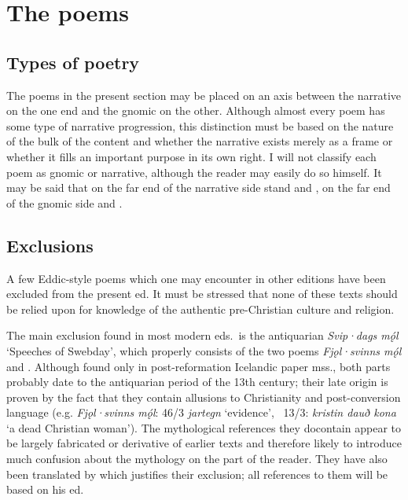 \section{The poems}

\subsection{Types of poetry}

The poems in the present section may be placed on an axis between the narrative on the one end and the gnomic on the other.  Although almost every poem has some type of narrative progression, this distinction must be based on the nature of the bulk of the content and whether the narrative exists merely as a frame or whether it fills an important purpose in its own right.  I will not classify each poem as gnomic or narrative, although the reader may easily do so himself.  It may be said that on the far end of the narrative side stand  and , on the far end of the gnomic side  and .

\subsection{Exclusions}

A few Eddic-style poems which one may encounter in other editions have been excluded from the present ed.  It must be stressed that none of these texts should be relied upon for knowledge of the authentic pre-Christian culture and religion.

The main exclusion found in most modern eds.~is the antiquarian \emph{Svip·dags mǫ́l} ‘Speeches of Swebday’, which properly consists of the two poems \emph{Fjǫl·svinns mǫ́l} and \Grougaldr.  Although found only in post-reformation Icelandic paper mss., both parts probably date to the antiquarian period of the 13th century; their late origin is proven by the fact that they contain allusions to Christianity and post-conversion language (e.g. \emph{Fjǫl·svinns mǫ́l}: 46/3 \emph{jartegn} ‘evidence’, \Grougaldr\ 13/3: \emph{kristin dauð kona} ‘a dead Christian woman’).  The mythological references they docontain appear to be largely fabricated or derivative of earlier texts and therefore likely to introduce much confusion about the mythology on the part of the reader.  They have also been translated by \textcite{PettitEdda} which justifies their exclusion; all references to them will be based on his ed.

